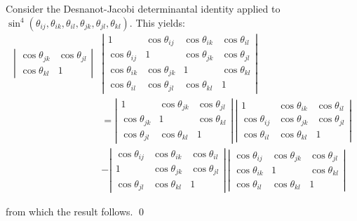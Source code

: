 \documentclass[fleqn,11pt,twoside]{article}
\makeatletter
\renewenvironment{proof}[1][\proofname]{\par
  \normalfont
  \topsep6\p@\@plus6\p@ \trivlist
  \item[\hskip\labelsep\textbf{%
    #1\@addpunct{.}}]\ignorespaces
}{%
  \qed\endtrivlist
}
\theoremstyle{definition}
\makeatother
\begin{document}
\begin{proof}
Consider the Desnanot-Jacobi determinantal identity applied to 
$\sin^4(\theta_{ij},\theta_{ik},\theta_{il},\theta_{jk},\theta_{jl},\theta_{kl})$. This yields: 
\begin{equation}
\begin{split} 
\left| \begin{array}{cc} \cos\theta_{jk} & \cos\theta_{jl} \\ \cos\theta_{kl} & 1\end{array}\right|&
\left| \begin{array}{cccc} 1 & \cos\theta_{ij} & \cos\theta_{ik} & \cos\theta_{il} \\ 
\cos\theta_{ij} & 1 & \cos\theta_{jk} & \cos\theta_{jl} \\ 
\cos\theta_{ik} & \cos\theta_{jk} & 1 & \cos\theta_{kl} \\
\cos\theta_{il} & \cos\theta_{jl}& \cos\theta_{kl} & 1 \end{array}\right| \\ 
&= \left| \begin{array}{ccc}  
 1 & \cos\theta_{jk} & \cos\theta_{jl} \\ 
 \cos\theta_{jk} & 1 & \cos\theta_{kl} \\
 \cos\theta_{jl}& \cos\theta_{kl} & 1 \end{array}\right| \, 
\left| \begin{array}{ccc} 1  & \cos\theta_{ik} & \cos\theta_{il} \\ 
\cos\theta_{ij} & \cos\theta_{jk} & \cos\theta_{jl} \\ 
\cos\theta_{il} & \cos\theta_{kl} & 1 \end{array}\right| \\ 
& - \left| \begin{array}{ccc}  \cos\theta_{ij} & \cos\theta_{ik} & \cos\theta_{il} \\ 
 1 & \cos\theta_{jk} & \cos\theta_{jl} \\ 
 \cos\theta_{jl}& \cos\theta_{kl} & 1 \end{array}\right|\, 
\left| \begin{array}{ccc} 
\cos\theta_{ij}  & \cos\theta_{jk} & \cos\theta_{jl} \\ 
\cos\theta_{ik}  & 1 & \cos\theta_{kl} \\
\cos\theta_{il} & \cos\theta_{kl} & 1 \end{array}\right|
\end{split} 
\end{equation}

from which the result follows. 
\end{proof}
\end{document}
